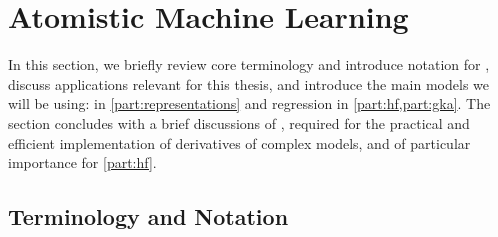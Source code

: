 
\chapter{Atomistic Machine Learning}
\label{ch:ml}


\noindent
{}
In this section, we briefly review core terminology and introduce notation for \ml, discuss applications relevant for this thesis, and introduce the main models we will be using:  in \cref{part:representations} and  regression in \cref{part:hf,part:gka}. The section concludes with a brief discussions of , required for the practical and efficient implementation of derivatives of complex models, and of particular importance for \cref{part:hf}.

\section{Terminology and Notation}

